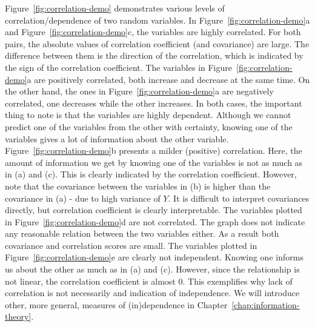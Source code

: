 Figure~\ref{fig:correlation-demo} demonstrates various levels of 
correlation/dependence of two random variables.
In Figure~\ref{fig:correlation-demo}a
and Figure~\ref{fig:correlation-demo}c,
the variables are highly correlated.
For both pairs,
the absolute values of correlation coefficient (and covariance) are large.
The difference between them is the direction of the correlation,
which is indicated by the sign of the correlation coefficient.
The variables in Figure~\ref{fig:correlation-demo}a are positively correlated,
both increase and decrease at the same time.
On the other hand, the ones
in Figure~\ref{fig:correlation-demo}a are negatively correlated,
one decreases while the other increases.
In both cases,
the important thing to note is that the variables are highly dependent.
Although we cannot predict one of the variables from the other with certainty,
knowing one of the variables gives a lot of information about the other variable.
Figure~\ref{fig:correlation-demo}b presents a milder (positive) correlation.
Here, the amount of information we get
by knowing one of the variables is not as much as in (a) and (c).
This is clearly indicated by the correlation coefficient.
However, note that the covariance between the variables in (b) is
higher than the covariance in (a) - due to high variance of $Y$.
It is difficult to interpret covariances directly,
but correlation coefficient is clearly interpretable.
The variables plotted in Figure~\ref{fig:correlation-demo}d are not correlated.
The graph does not indicate any reasonable relation between the two variables either.
As a result both covariance and correlation scores are small.
The variables plotted in Figure~\ref{fig:correlation-demo}e are
clearly not independent.
Knowing one informs us about the other as much as in (a) and (c).
However, since the relationship is not linear,
the correlation coefficient is almost \num{0}.
This exemplifies why lack of correlation is
not necessarily and indication of independence.
We will introduce other, more general,
measures of (in)dependence in Chapter~\ref{chap:information-theory}.

